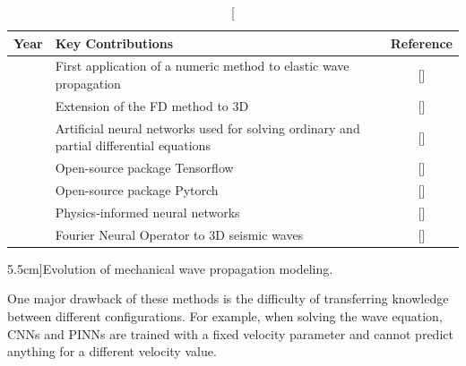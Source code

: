 \documentclass{tufte-handout}
\begin{document}
\begin{table}[h]
    \centering
    \label{tab:algorithm-pinns}
    \begin{tabular}{|c|l|c|}
    \hline
    Year & Key Contributions & Reference \\ \hline
    \citeyear{alterman_propagation_1968} &  {First application of a numeric method to elastic wave propagation} & [\citealp{alterman_propagation_1968}]\\ \hline
    \citeyear{frankel_three-dimensional_1992} &  Extension of the FD method to 3D & [\citealp{frankel_three-dimensional_1992}] \\ \hline
    \citeyear{lagaris_artificial_1998} &  Artificial neural networks used for solving ordinary and partial differential equations & [\citealp{lagaris_artificial_1998}]\\ \hline
    \citeyear{abadi_tensorflow_2016} &  Open-source package Tensorflow & [\citealp{abadi_tensorflow_2016}]\\ \hline
    \citeyear{paszke_pytorch_2019} &  Open-source package Pytorch & [\citealp{paszke_pytorch_2019}]\\ \hline
    \citeyear{Raissi2019} &  Physics-informed neural networks & [\citealp{Raissi2019}] \\ \hline
    \citeyear{lehmann_fourier_2023}  & Fourier Neural Operator to 3D seismic waves  & [\citealp{lehmann_fourier_2023}] \\ \hline
    \end{tabular}
    \caption[][5.5cm]{Evolution of mechanical wave propagation modeling.}
\end{table}

One major drawback of these methods is the difficulty of transferring knowledge between different configurations. For example, when solving the wave equation, CNNs and PINNs are trained with a fixed velocity parameter and cannot predict anything for a different velocity value.


\end{document}
